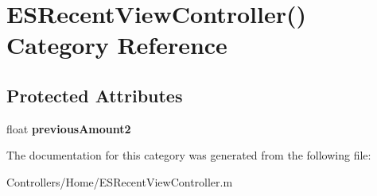 \hypertarget{category_e_s_recent_view_controller_07_08}{}\section{E\+S\+Recent\+View\+Controller() Category Reference}
\label{category_e_s_recent_view_controller_07_08}
\subsection*{Protected Attributes}
\begin{DoxyCompactItemize}
\item 
\hypertarget{category_e_s_recent_view_controller_07_08_a9704db969dff248216fc4bf54db6b485}{}float {\bfseries previous\+Amount2}\label{category_e_s_recent_view_controller_07_08_a9704db969dff248216fc4bf54db6b485}

\end{DoxyCompactItemize}


The documentation for this category was generated from the following file\+:\begin{DoxyCompactItemize}
\item 
Controllers/\+Home/E\+S\+Recent\+View\+Controller.\+m\end{DoxyCompactItemize}
